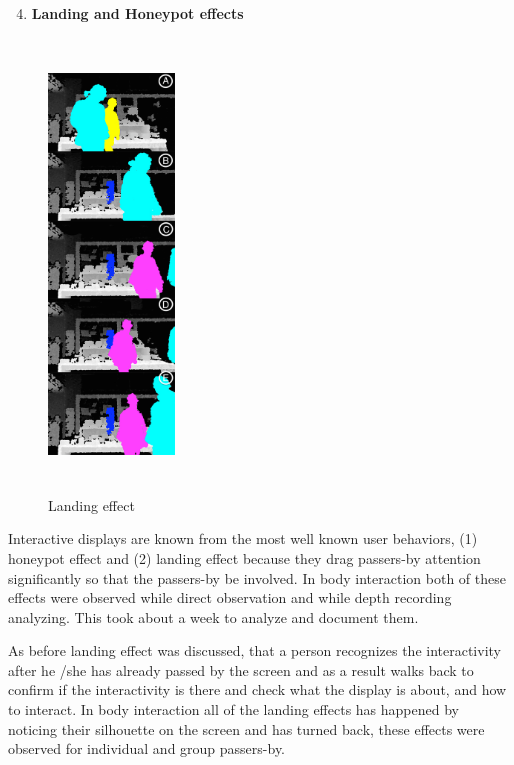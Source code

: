 \newpage
\begin{enumerate}
\setcounter{enumi}{3}
\item \textbf{Landing and Honeypot effects}
\end{enumerate}

\begin{figure}
  \vspace{-60pt}
  \begin{center}
    \includegraphics[width=0.3\textwidth,height=120mm]{figures/8/body_inter_findings/effects/landing}
  \end{center}
  \vspace{-20pt}
  \caption{Landing effect}
  \vspace{-10pt}
\end{figure}
Interactive displays are known from the most well known user behaviors, (1) honeypot effect and (2) landing effect because they drag passers-by attention significantly so that the passers-by be involved. In body interaction both of these effects were observed while direct observation and while depth recording analyzing. This took about a week to analyze and document them.

As before landing effect was discussed, that a person recognizes the interactivity after he /she has already passed by the screen and as a result walks back to confirm if the interactivity is there and check what the display is about, and how to interact. In body interaction all of the landing effects has happened by noticing their silhouette on the screen and has turned back, these effects were observed for individual and group passers-by.

